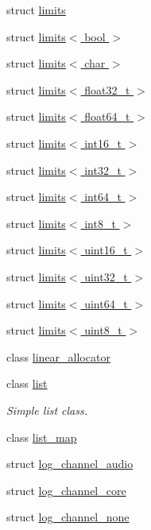 \begin{DoxyCompactItemize}
\item 
struct \hyperlink{structcrap_1_1limits}{limits}
\item 
struct \hyperlink{structcrap_1_1limits_3_01bool_01_4}{limits$<$ bool $>$}
\item 
struct \hyperlink{structcrap_1_1limits_3_01char_01_4}{limits$<$ char $>$}
\item 
struct \hyperlink{structcrap_1_1limits_3_01float32__t_01_4}{limits$<$ float32\+\_\+t $>$}
\item 
struct \hyperlink{structcrap_1_1limits_3_01float64__t_01_4}{limits$<$ float64\+\_\+t $>$}
\item 
struct \hyperlink{structcrap_1_1limits_3_01int16__t_01_4}{limits$<$ int16\+\_\+t $>$}
\item 
struct \hyperlink{structcrap_1_1limits_3_01int32__t_01_4}{limits$<$ int32\+\_\+t $>$}
\item 
struct \hyperlink{structcrap_1_1limits_3_01int64__t_01_4}{limits$<$ int64\+\_\+t $>$}
\item 
struct \hyperlink{structcrap_1_1limits_3_01int8__t_01_4}{limits$<$ int8\+\_\+t $>$}
\item 
struct \hyperlink{structcrap_1_1limits_3_01uint16__t_01_4}{limits$<$ uint16\+\_\+t $>$}
\item 
struct \hyperlink{structcrap_1_1limits_3_01uint32__t_01_4}{limits$<$ uint32\+\_\+t $>$}
\item 
struct \hyperlink{structcrap_1_1limits_3_01uint64__t_01_4}{limits$<$ uint64\+\_\+t $>$}
\item 
struct \hyperlink{structcrap_1_1limits_3_01uint8__t_01_4}{limits$<$ uint8\+\_\+t $>$}
\item 
class \hyperlink{classcrap_1_1linear__allocator}{linear\+\_\+allocator}
\item 
class \hyperlink{classcrap_1_1list}{list}
\begin{DoxyCompactList}\small\item\em Simple list class. \end{DoxyCompactList}\item 
class \hyperlink{classcrap_1_1list__map}{list\+\_\+map}
\item 
struct \hyperlink{structcrap_1_1log__channel__audio}{log\+\_\+channel\+\_\+audio}
\item 
struct \hyperlink{structcrap_1_1log__channel__core}{log\+\_\+channel\+\_\+core}
\item 
struct \hyperlink{structcrap_1_1log__channel__none}{log\+\_\+channel\+\_\+none}
\item 

\end{DoxyCompactItemize}
